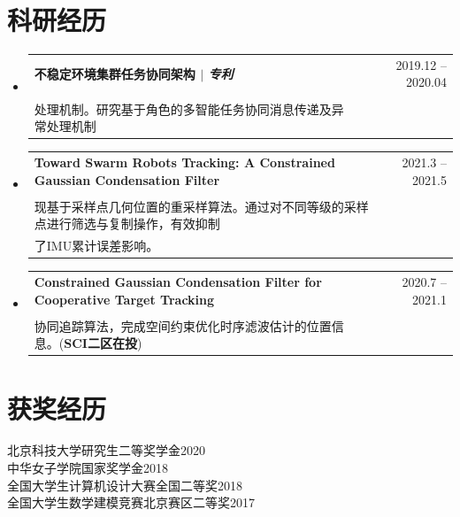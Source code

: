 \documentclass[a4paper,11pt]{ctexart}
\makeatletter
\newcommand{\CVItem}[1]{
	\item\small{
		{#1 \vspace{-2pt}}
	}
}
\newcommand{\CVSubheading}[4]{
	\vspace{-2pt}\item
	\begin{tabular*}{0.97\textwidth}[t]{l@{\extracolsep{\fill}}r}
		\textbf{#1} & #2 \\
		\small#3 & \small #4 \\
	\end{tabular*}\vspace{-7pt}
}
\newcommand{\CVSubHeadingListStart}{\begin{itemize}[leftmargin=0.5cm, label={}]}
\newcommand{\CVSubHeadingListEnd}{\end{itemize}}
\newcommand{\CVItemListStart}{\begin{itemize}}
\newcommand{\CVItemListEnd}{\end{itemize}\vspace{-5pt}}
\makeatother
\begin{document}
	\section{科研经历}
	\CVSubHeadingListStart
	\CVSubheading
	{不稳定环境集群任务协同架构 $|$ \emph{\small{专利}}}{2019.12 -- 2020.04}
	{\makecell[l]{\hspace{2em}构建基于角色的多智能体协同模型体系，建立多智能体间通用的分布式自适应的协同任务\\
		处理机制。研究基于角色的多智能任务协同消息传递及异常处理机制}}{}
	\CVSubheading
	{\small\textbf{Toward Swarm Robots Tracking: A Constrained Gaussian Condensation Filter}}{2021.3 -- 2021.5}
	{\makecell[l]{\hspace{2em}针对目标追踪存在的累计误差问题，根据IMU预估中心以及置信规模，建立误差椭圆，实\\
	现基于采样点几何位置的重采样算法。通过对不同等级的采样点进行筛选与复制操作，有效抑制\\
	了IMU累计误差影响。}}{}
	\CVSubheading
	{\small\textbf{Constrained Gaussian Condensation Filter for Cooperative Target Tracking} }{2020.7 -- 2021.1}
	{\makecell[l]{\hspace{2em}基于时空约束高斯聚合滤波的协同运动追踪，提出一种基于时空约束高斯聚合滤波的多目标\\
			协同追踪算法，完成空间约束优化时序滤波估计的位置信息。(\textbf{SCI二区在投})}}{}
	\CVSubHeadingListEnd
	
	

	
	\section{获奖经历}
	{北京科技大学研究生二等奖学金}\hfill{2020}\\
	{中华女子学院国家奖学金}\hfill{2018} \\
	{全国大学生计算机设计大赛全国二等奖}\hfill{2018} \\
	{全国大学生数学建模竞赛北京赛区二等奖}\hfill{2017}\\

	

	
\end{document}
